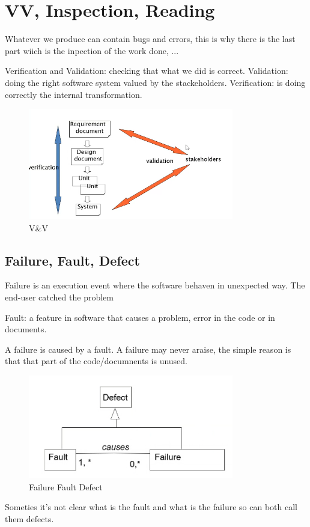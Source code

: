 \documentclass[12pt]{article}
\begin{document}
\newpage
\section{VV, Inspection, Reading}
Whatever we produce can contain bugs and errors, this is why there is the last part wiich is the inpection of the work done, ...

Verification and Validation: checking that what we did is correct. Validation: doing the right software system valued by the stackeholders. Verification: is doing correctly the internal transformation.
\begin{figure}[H]
  \centering
  \includegraphics[width=0.8\textwidth]{vv.png}
  \caption{V\&V}
  \label{fig:vv}
\end{figure}



\subsection{Failure, Fault, Defect}
Failure is an execution event where the software behaven in unexpected way. The end-user catched the problem

Fault: a feature in software that causes a problem, error in the code or in documents.

A failure is caused by a fault. A failure may never araise, the simple reason is that that part of the code/documnents is unused.
\begin{figure}[H]
  \centering
  \includegraphics[width=0.8\textwidth]{failure-fault-defect.png}
  \caption{Failure Fault Defect}
  \label{fig:failure-fault-defect}
\end{figure}
Someties it's not clear what is the fault and what is the failure so can both call them defects.
\end{document}
